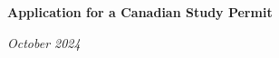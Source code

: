 \begin{titlepage}
    \AddToShipoutPicture*{\backgroundpicTR}
    \vfill
    \begin{minipage}{0.9\textwidth}
        \hfill
        \vspace{2.5cm}
        {\color{myBlue}\singlespacing\fontsize{40}{50}\selectfont\bfseries{}\par}
        \vspace{0.4cm}
        {\color{myBlue}\singlespacing\fontsize{40}{50}\selectfont\bfseries{}\par}
        \vspace{1.5cm}
        {\color{myBlue}\bfseries\Large{Application for a Canadian Study Permit}\par}
        \vspace{13cm}
        {\Large{\textit{\color{black}{Alireza Heidari}}}\par}
        \vspace{0.5cm}
        {\normalsize{\textit{October 2024}}\par}
    \end{minipage}
\end{titlepage}

\clearpage
